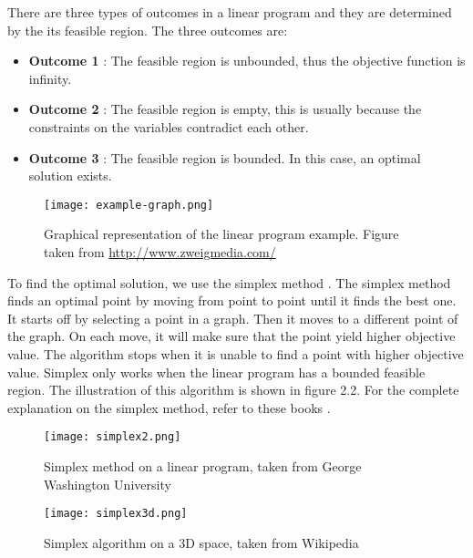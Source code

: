 There are three types of outcomes \cite{LPChvatal,ILPCoursera} in a linear program and they are determined by the
its feasible region. The three outcomes are:
\begin{itemize}
\item \textbf{Outcome 1} : The feasible region is unbounded, thus the objective function is infinity.
\item \textbf{Outcome 2} : The feasible region is empty, this is usually because the constraints on the variables contradict each other.
\item \textbf{Outcome 3} : The feasible region is bounded. In this case, an optimal solution exists.
\end{itemize}

\begin{figure}[!ht]
  \centering
    \texttt{[image: example-graph.png]}
    \caption{Graphical representation of the linear program example. Figure taken from \url{http://www.zweigmedia.com/}\cite{zweigmedia}}
\end{figure}

To find the optimal solution, we use the simplex method \cite{LPChvatal, LPVanderbei}.
The simplex method finds an optimal point by moving from point to point until it finds the best one.
It starts off by selecting a point in a graph.
Then it moves to a different point of the graph. On each move, it will make sure that the point yield higher
objective value. The algorithm stops when it is unable to find a point with higher objective value.
Simplex only works when the linear program has a bounded feasible region. The illustration of this algorithm is shown in figure 2.2.
For the complete explanation on the simplex method, refer to these books \cite{LPChvatal, LPVanderbei}.
\begin{figure}[!ht]
  \centering
    \texttt{[image: simplex2.png]}
    \caption{Simplex method on a linear program, taken from George Washington University \cite{seas:SM}}
    \vspace{1cm}
    \texttt{[image: simplex3d.png]}
    \caption{Simplex algorithm on a 3D space, taken from Wikipedia \cite{Wiki:SPM}}
    \vspace{1cm}
\end{figure}

